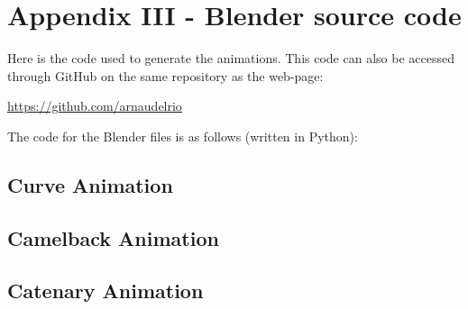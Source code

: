 \documentclass[12pt,twoside,a4paper]{article}
\begin{document}
	\begin{table}[H]
		\centering
		\caption{Tibidabo Roller Coasters}
	\end{table}

	\cleardoublepage
	
	\section{Appendix III - Blender source code}
	\label{sec:Appendix III}
	Here is the code used to generate the animations. This code can also be accessed through GitHub on the same repository as the web-page:
	
	\href{https://github.com/arnaudelrio}{https://github.com/arnaudelrio}
	
	The code for the Blender files is as follows (written in Python):
	
	\subsection{Curve Animation}
	\label{sec:Appendix III_Curve}
	
	\newpage
	
	\subsection{Camelback Animation}
	\label{sec:Appendix III_Parabola}
	
	\newpage
	
	\subsection{Catenary Animation}
	\label{sec:Appendix III_Catenary}
	
\end{document}
